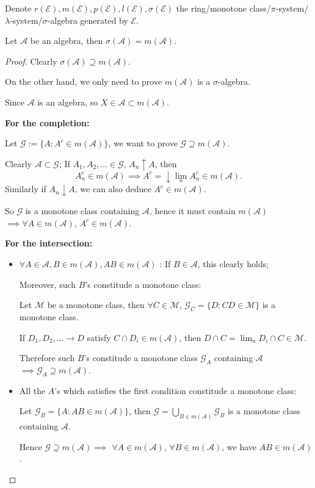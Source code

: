 Denote $r(\mathscr{E}), m(\mathscr{E}), p(\mathscr{E}), l(\mathscr{E}), \sigma(\mathscr{E})$
the ring/monotone class/$\pi$-system/$\lambda$-system/$\sigma$-algebra
generated by  $\mathscr{E}$.
\begin{theorem}
    Let $\mathscr{A}$ be an algebra, then $\sigma(\mathscr{A}) = m(\mathscr{A})$.
\end{theorem}
\begin{proof}[Proof]
    Clearly $\sigma(\mathscr{A})\supseteq m(\mathscr{A})$.

	On the other hand, we only need to prove $m(\mathscr{A})$ is
	a $\sigma$-algebra.

	Since $\mathscr{A}$ is an algebra, so $X\in \mathscr{A} \subset m(\mathscr{A})$.

	\textbf{For the completion:}

	Let $\mathscr{G}:=\{A:A^c\in m(\mathscr{A})\}$,
	we want to prove $\mathscr{G}\supseteq m(\mathscr{A})$.

	Clearly $\mathscr{A} \subset \mathscr{G}$; If $A_1,A_2,\dots\in \mathscr{G}$,
	$A_n\uparrow A$, then
	\[
	A_n^c\in m(\mathscr{A}) \implies A^c = \downarrow\lim_{n} A_n^c\in m(\mathscr{A}).
	\]
	Similarly if $A_n\downarrow A$, we can also deduce  $A^c\in m(\mathscr{A})$.

	So $\mathscr{G}$ is a monotone class containing $\mathscr{A}$, hence
	it must contain $m(\mathscr{A})$ $ \implies \forall A\in m(\mathscr{A})$,
	$A^c\in m(\mathscr{A})$.

	\textbf{For the intersection:}
	\begin{itemize}
		\item $\forall A\in \mathscr{A}, B\in m(\mathscr{A}), AB\in m(\mathscr{A})$ :
			If $B\in \mathscr{A}$, this clearly holds;

			Moreover, such $B$'s constitude a monotone class:
			\begin{claim}
				Let $\mathscr{M}$ be a monotone class, then $\forall C\in \mathscr{M}$,
				$\mathscr{G}_C = \{D: CD\in \mathscr{M}\}$ is a monotone class.
			\end{claim}
			If  $D_1,D_2,\dots \to D$ satisfy $C\cap D_i\in m(\mathscr{A})$,
			then $D\cap C = \lim_n D_i\cap C \in \mathscr{M}$.

			Therefore such $B$'s constitude a monotone class
			$\mathscr{G}_A$ containing $\mathscr{A}$
			$\implies \mathscr{G}_A\supseteq m(\mathscr{A})$.
		\item All the $A$'s which satisfies the first condition constitude a
			monotone class:

			Let  $\mathscr{G}_B = \{A: AB\in m(\mathscr{A})\}$,
			then $\mathscr{G} = \bigcup_{B\in m(\mathscr{A})} \mathscr{G}_B$
			is a monotone class containing $\mathscr{A}$.

			Hence $\mathscr{G}\supseteq m(\mathscr{A})\implies$
			$\forall A\in m(\mathscr{A})$, $\forall B\in m(\mathscr{A})$,
			we have $AB\in m(\mathscr{A})$.
	\end{itemize}
\end{proof}


